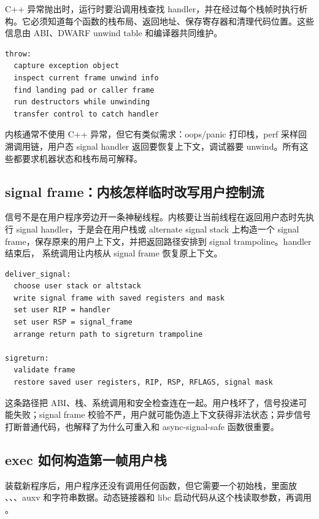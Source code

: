 C++ 异常抛出时，运行时要沿调用栈查找 handler，并在经过每个栈帧时执行析构。它必须知道每个函数的栈布局、返回地址、保存寄存器和清理代码位置。这些信息由 ABI、DWARF unwind table 和编译器共同维护。

\begin{lstlisting}
throw:
  capture exception object
  inspect current frame unwind info
  find landing pad or caller frame
  run destructors while unwinding
  transfer control to catch handler
\end{lstlisting}

内核通常不使用 C++ 异常，但它有类似需求：oops/panic 打印栈，perf 采样回溯调用链，用户态 signal handler 返回要恢复上下文，调试器要 unwind。所有这些都要求机器状态和栈布局可解释。

\subsection{signal frame：内核怎样临时改写用户控制流}

信号不是在用户程序旁边开一条神秘线程。内核要让当前线程在返回用户态时先执行 signal handler，于是会在用户栈或 alternate signal stack 上构造一个 signal frame，保存原来的用户上下文，并把返回路径安排到 signal trampoline。handler 结束后， 系统调用让内核从 signal frame 恢复原上下文。

\begin{lstlisting}
deliver_signal:
  choose user stack or altstack
  write signal frame with saved registers and mask
  set user RIP = handler
  set user RSP = signal_frame
  arrange return path to sigreturn trampoline

sigreturn:
  validate frame
  restore saved user registers, RIP, RSP, RFLAGS, signal mask
\end{lstlisting}

这条路径把 ABI、栈、系统调用和安全检查连在一起。用户栈坏了，信号投递可能失败；signal frame 校验不严，用户就可能伪造上下文获得非法状态；异步信号打断普通代码，也解释了为什么可重入和 async-signal-safe 函数很重要。

\subsection{exec 如何构造第一帧用户栈}

 装载新程序后，用户程序还没有调用任何函数，但它需要一个初始栈，里面放 、、、auxv 和字符串数据。动态链接器和 libc 启动代码从这个栈读取参数，再调用 。

